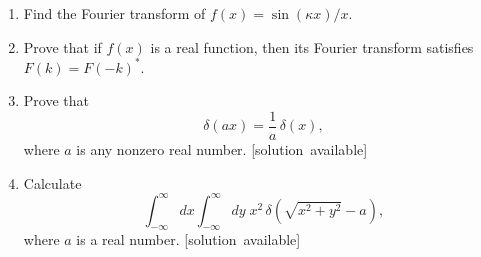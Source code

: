 \documentclass[10pt,a4paper]{article}
\begin{document}
\begin{enumerate}
\item
  Find the Fourier transform of $f(x) = \sin(\kappa x)/x.$

\item
  Prove that if $f(x)$ is a real function, then its Fourier transform
  satisfies $F(k) = F(-k)^*$.

\item
  Prove that
  \begin{equation}
    \delta(ax) = \frac{1}{a}\,\delta(x),
  \end{equation}
  where $a$ is any nonzero real number.
  \hfill{\scriptsize [solution~available]}

\item Calculate
  \begin{equation}
    \int_{-\infty}^\infty dx \int_{-\infty}^\infty dy \;
    x^2\, \delta\left(\sqrt{x^2+y^2}-a\right),
  \end{equation}
  where $a$ is a real number.
  \hfill{\scriptsize [solution~available]}
  
\end{enumerate}
    
\end{document}
